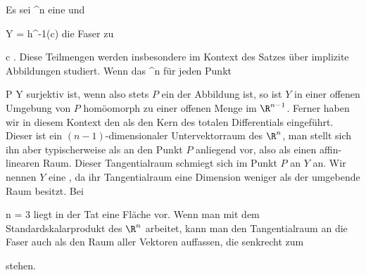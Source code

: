 \setcounter{section}{1}


Es sei
 {\R^n } { \R
} {}
eine
und

\mavergleichskette
{\vergleichskette
{ Y
}
{ = }{ h^{-1}(c)
}
{  }{
}
{    }{
}
{   }{
}
}
{}{}{}
die Faser zu

\mavergleichskette
{\vergleichskette
{ c
}
{ \in }{ \R
}
{  }{
}
{    }{
}
{   }{
}
}
{}{}{.}
Diese Teilmengen werden insbesondere im Kontext des Satzes über implizite Abbildungen studiert. Wenn das
 {\R^n } { \R
} {}
für jeden Punkt

\mavergleichskette
{\vergleichskette
{ P
}
{ \in }{ Y
}
{  }{
}
{    }{
}
{   }{
}
}
{}{}{}
surjektiv ist, wenn also stets $P$ ein
der Abbildung ist, so ist $Y$ in einer offenen Umgebung von $P$ homöomorph zu einer offenen Menge im $\R^{n-1}$. Ferner haben wir in diesem Kontext den
als den Kern des totalen Differentials eingeführt. Dieser ist ein $(n-1 )$-dimensionaler Untervektorraum des $\R^n$, man stellt sich ihn aber typischerweise als an den Punkt $P$  anliegend vor, also als einen affin-linearen Raum. Dieser Tangentialraum schmiegt sich im Punkt $P$ an $Y$ an. Wir nennen $Y$ eine  {,} da ihr Tangentialraum eine Dimension weniger als der umgebende Raum besitzt. Bei

\mavergleichskette
{\vergleichskette
{ n
}
{ = }{ 3
}
{  }{
}
{    }{
}
{   }{
}
}
{}{}{}
liegt in der Tat eine Fläche vor. Wenn man mit dem Standardskalarprodukt des $\R^n$ arbeitet, kann man den Tangentialraum an die Faser auch als den Raum aller Vektoren auffassen, die senkrecht zum

 stehen.

